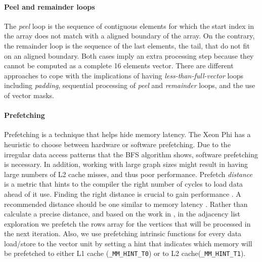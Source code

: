 \documentclass{sig-alternate-05-2015}
\begin{document}
\paragraph{\textbf{Peel and remainder loops}}
The \textit{peel} loop is the sequence of contiguous elements for
which the start index in the array does not match with a aligned
boundary of the array. On the contrary, the remainder loop is the
sequence of the last elements, the tail, that do not fit on an aligned
boundary. Both cases imply an extra processing step because they
cannot be computed as a complete 16 elements vector. There are
different approaches to cope with the implications of having
\textit{less-than-full-vector} loops including \textit{padding},
sequential processing of \textit{peel} and \textit{remainder} loops,
and the use of vector masks.

























































\paragraph{\textbf{Prefetching}}
\label{par:prefet}
Prefetching is a technique that helps hide memory latency. The Xeon
Phi has a heuristic to choose between hardware or software
prefetching. Due to the irregular data access patterns that the BFS
algorithm shows, software prefetching is necessary. In addition,
working with large graph sizes might result in having large numbers of
L2 cache misses, and thus poor performance. Prefetch {\em distance} is
a metric that hints to the compiler the right number of cycles to load
data ahead of it use. Finding the right distance is crucial to gain
performance \cite{Mehta:2014}. A recommended distance should be one
similar to memory latency \cite{Badawy04}. Rather than calculate a
precise distance, and based on the work in \cite{JhaHLCH15}, in the
adjacency list exploration we prefetch the rows array for the vertices
that will be processed in the next iteration. Also, we use prefetching
intrinsic functions for every data load/store to the vector unit by
setting a hint that indicates which memory will be prefetched to
either L1 cache (\texttt{\_MM\_HINT\_T0}) or to L2
cache(\texttt{\_MM\_HINT\_T1}).
\end{document}
